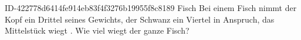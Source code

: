 \begin{exercise}
      {ID-422778d6414fe914eb83f4f3276b19955f8c8189}
      {Fisch}
  \ifproblem\problem
    Bei einem Fisch nimmt der Kopf ein Drittel seines Gewichts, der Schwanz
    ein Viertel in Anspruch, das Mittelstück wiegt . Wie viel wiegt
    der ganze Fisch?
  \fi
\end{exercise}
